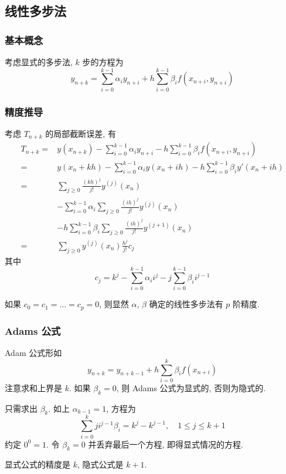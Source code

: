 \documentclass{ctexart}
\begin{document}
\subsection{线性多步法}
\subsubsection{基本概念}
    考虑显式的多步法, $k$ 步的方程为 \[
        y_{n+k} = \sum_{i=0}^{k-1} \alpha_i y_{n+i} + h \sum_{i=0}^{k-1} \beta_i f(x_{n+i}, y_{n+i})\]
\subsubsection{精度推导}
    考虑 $T_{n+k}$ 的局部截断误差, 有 \begin{align*}
        T_{n+k} =& y(x_{n+k}) - \sum_{i=0}^{k-1} \alpha_i y_{n+i} - h \sum_{i=0}^{k-1} \beta_i f(x_{n+i}, y_{n+i})\\
                =& y(x_n + kh) - \sum_{i=0}^{k-1} \alpha_i y(x_n + ih) - h \sum_{i=0}^{k-1} \beta_i y'(x_n + ih)\\
                =& \sum_{j\ge 0} \frac{(kh)^j}{j!} y^{(j)}(x_n) \\
                &- \sum_{i=0}^{k-1} \alpha_i \sum_{j\ge 0} \frac{(ih)^j}{j!} y^{(j)}(x_n) \\
                &- h \sum_{i=0}^{k-1} \beta_i \sum_{j\ge 0} \frac{(ih)^j}{j!} y^{(j+1)}(x_n)\\
                =& \sum_{j\ge 0} y^{(j)}(x_n) \frac{h^j}{j!} c_j
    \end{align*}
    其中 \[
        c_j =  k^j - \sum_{i=0}^{k-1} \alpha_i i^j - j\sum_{i=0}^{k-1} \beta_i i^{j-1}\]
    \par
    如果 $c_0 = c_1 = \ldots = c_p = 0$, 则显然 $\alpha$, $\beta$ 确定的线性多步法有 $p$ 阶精度.
\subsubsection{Adams 公式}
    Adam 公式形如 \[
        y_{n+k} = y_{n+k-1} + h\sum_{i=0}^{k} \beta_i f(x_{n+i})\]
    注意求和上界是 $k$. 如果 $\beta_k =0$, 则 Adams 公式为显式的,
    否则为隐式的.\par
    只需求出 $\beta_k$. 如上 $\alpha_{k-1} = 1$, 方程为 \[
        \sum_{i=0}^{k} j i^{j-1} \beta_i = k^j - k^{j-1},\quad 1 \le j \le k+1\]
    约定 $0^0 = 1$. 令 $\beta_{k} =0$ 并丢弃最后一个方程, 即得显式情况的方程.\par
    显式公式的精度是 $k$, 隐式公式是 $k+1$.
\end{document}
